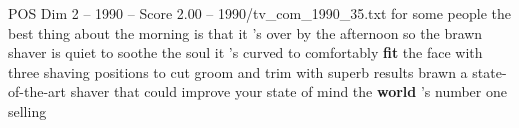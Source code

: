 \begin{textsample}{POS Dim 2 – 1990 – Score 2.00 – 1990/tv\_com\_1990\_35.txt}  \label{ex:f2_pos_031}
for some people the best thing about the morning is that it 's over by the afternoon so the brawn shaver is quiet to soothe the soul it 's curved to comfortably \textbf{fit} the face with three shaving positions to cut groom and trim with superb results brawn a state-of-the-art shaver that could improve your state of mind the \textbf{world} 's number one selling

\end{textsample}
